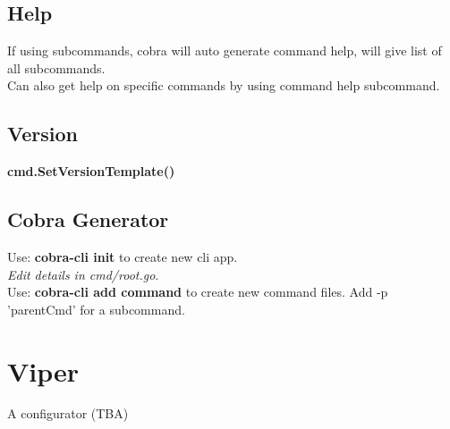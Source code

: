 \documentclass[11pt]{scrartcl} %
\begin{document}
\subsection{Help}

If using subcommands, cobra will auto generate command help, will give list of all subcommands. \\

Can also get help on specific commands by using command help subcommand.

\subsection{Version}

\textbf{cmd.SetVersionTemplate()}

\subsection{Cobra Generator}

Use: \textbf{cobra-cli init} to create new cli app.\\

\textit{Edit details in cmd/root.go}. \\

Use: \textbf{cobra-cli add command} to create new command files. Add -p 'parentCmd' for a subcommand.

\section{Viper}

A configurator (TBA)




\end{document}
